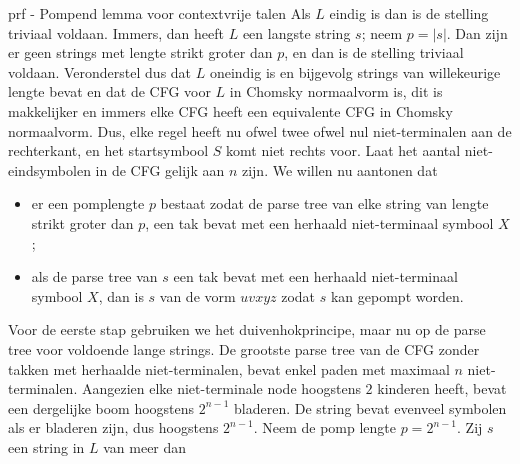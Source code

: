 \begin{prf}{prf - Pompend lemma voor contextvrije talen}
    Als $L$ eindig is dan is de stelling triviaal voldaan. Immers, dan heeft $L$ een langste string $s$; 
    neem $p = |s|$. Dan zijn er geen strings met lengte strikt groter dan $p$, en
    dan is de stelling triviaal voldaan. Veronderstel dus dat $L$ oneindig is en bijgevolg strings van willekeurige lengte bevat en dat de CFG voor $L$ in Chomsky normaalvorm is, dit is makkelijker en immers elke CFG heeft een equivalente CFG in Chomsky normaalvorm. Dus, elke regel heeft nu ofwel twee ofwel nul niet-terminalen aan de rechterkant, en het startsymbool $S$ komt niet rechts voor. Laat het aantal niet-eindsymbolen in de CFG gelijk aan $n$ zijn. We willen nu aantonen dat 
    \begin{itemize}
        \item er een pomplengte $p$ bestaat zodat de parse tree van elke string van lengte strikt groter dan $p$, een tak bevat met een herhaald niet-terminaal symbool $X$;
        \item als de parse tree van $s$ een tak bevat met een herhaald niet-terminaal symbool $X$, dan is $s$ van de vorm $uvxyz$ zodat $s$ kan gepompt worden.
    \end{itemize} 
    Voor de eerste stap gebruiken we het duivenhokprincipe, maar nu op de parse tree voor voldoende lange strings.  De grootste parse tree van de CFG zonder takken met herhaalde niet-terminalen, bevat enkel paden met maximaal $n$ niet-terminalen. Aangezien elke niet-terminale node hoogstens $2$ kinderen heeft, bevat een dergelijke boom hoogstens $2^{n-1}$ bladeren. De string bevat evenveel symbolen als er bladeren zijn, dus hoogstens $2^{n-1}$. Neem de pomp lengte $p = 2^{n-1}$. Zij $s$ een string in $L$ van meer dan


\end{prf}
